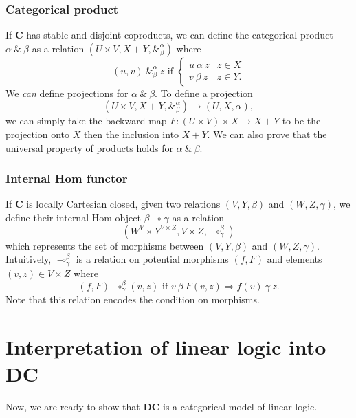 \documentclass[a4paper]{article}
\newcommand{\DC}{\textbf{DC}}
\newcommand{\C}{\textbf{C}}
\begin{document}
\subsubsection{Categorical product}
If \C{} has stable and disjoint coproducts, we can define the categorical product $\alpha \ \&\ \beta$ as a relation $(U\times V, X+Y,\&^\alpha_\beta)$ where
\begin{equation*}
    (u,v)\ \&^\alpha_\beta\ z\text{ if }
    \begin{cases}
        u\ \alpha\ z & z\in X \\
        v\ \beta\ z & z\in Y.
    \end{cases}
\end{equation*}
We \emph{can} define projections for $\alpha\ \&\ \beta$. To define a projection
\begin{equation*}
    (U\times V,X+Y,\&^\alpha_\beta)\to(U,X,\alpha),
\end{equation*}
we can simply take the backward map $F:(U\times V)\times X\to X+Y$ to be the projection onto $X$ then the inclusion into $X+Y$. We can also prove that the universal property of products holds for $\alpha\ \&\ \beta$.

\subsubsection{Internal Hom functor}
If \C{} is locally Cartesian closed, given two relations $(V, Y,\beta)$ and $(W,Z,\gamma)$, we define their internal Hom object $\beta\multimap\gamma$ as a relation
\begin{equation*}
    (W^V\times Y^{V\times Z}, V\times Z,\multimap^\beta_\gamma)
\end{equation*} 
which represents the set of morphisms between $(V,Y,\beta)$ and $(W,Z,\gamma)$. Intuitively, $\multimap^\beta_\gamma$ is a relation on potential morphisms $(f,F)$ and elements $(v,z)\in V\times Z$ where 
\begin{equation*}
    (f,F) \multimap^\beta_\gamma (v,z)\text{ if } v\ \beta\ F(v,z)\Rightarrow f(v)\ \gamma\ z.
\end{equation*}
Note that this relation encodes the condition on morphisms.

\section{Interpretation of linear logic into DC}

Now, we are ready to show that \DC{} is a categorical model of linear logic. 
\end{document}
